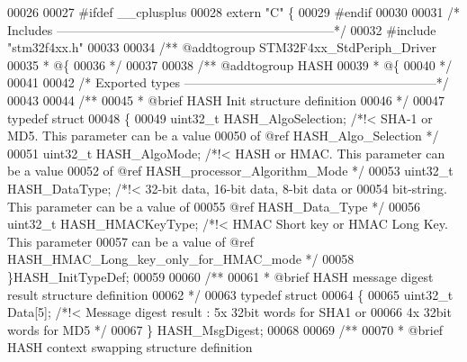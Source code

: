 \begin{DoxyCode}
00026 
00027 \textcolor{preprocessor}{#}\textcolor{preprocessor}{ifdef} \_\_cplusplus
00028  \textcolor{keyword}{extern} \textcolor{stringliteral}{"C"} \{
00029 \textcolor{preprocessor}{#}\textcolor{preprocessor}{endif}
00030 
00031 \textcolor{comment}{/* Includes ------------------------------------------------------------------*/}
00032 \textcolor{preprocessor}{#}\textcolor{preprocessor}{include} "stm32f4xx.h"
00033 
00034 \textcolor{comment}{/** @addtogroup STM32F4xx\_StdPeriph\_Driver}
00035 \textcolor{comment}{  * @\{}
00036 \textcolor{comment}{  */}
00037 
00038 \textcolor{comment}{/** @addtogroup HASH}
00039 \textcolor{comment}{  * @\{}
00040 \textcolor{comment}{  */}
00041 
00042 \textcolor{comment}{/* Exported types ------------------------------------------------------------*/}
00043 
00044 \textcolor{comment}{/** }
00045 \textcolor{comment}{  * @brief   HASH Init structure definition}
00046 \textcolor{comment}{  */}
00047 \textcolor{keyword}{typedef} \textcolor{keyword}{struct}
00048 \{
00049   uint32\_t HASH_AlgoSelection; \textcolor{comment}{/*!< SHA-1 or MD5. This parameter can be a value }
00050 \textcolor{comment}{                                    of @ref HASH\_Algo\_Selection */}
00051   uint32\_t HASH_AlgoMode;      \textcolor{comment}{/*!< HASH or HMAC. This parameter can be a value }
00052 \textcolor{comment}{                                    of @ref HASH\_processor\_Algorithm\_Mode */}
00053   uint32\_t HASH_DataType;      \textcolor{comment}{/*!< 32-bit data, 16-bit data, 8-bit data or }
00054 \textcolor{comment}{                                    bit-string. This parameter can be a value of}
00055 \textcolor{comment}{                                    @ref HASH\_Data\_Type */}
00056   uint32\_t HASH_HMACKeyType;   \textcolor{comment}{/*!< HMAC Short key or HMAC Long Key. This parameter}
00057 \textcolor{comment}{                                    can be a value of @ref HASH\_HMAC\_Long\_key\_only\_for\_HMAC\_mode */}
00058 \}HASH\_InitTypeDef;
00059 
00060 \textcolor{comment}{/** }
00061 \textcolor{comment}{  * @brief  HASH message digest result structure definition  }
00062 \textcolor{comment}{  */}
00063 \textcolor{keyword}{typedef} \textcolor{keyword}{struct}
00064 \{
00065   uint32\_t Data[5];      \textcolor{comment}{/*!< Message digest result : 5x 32bit words for SHA1 or }
00066 \textcolor{comment}{                                                      4x 32bit words for MD5  */}
00067 \} HASH\_MsgDigest;
00068 
00069 \textcolor{comment}{/** }
00070 \textcolor{comment}{  * @brief  HASH context swapping structure definition  }

\end{DoxyCode}

